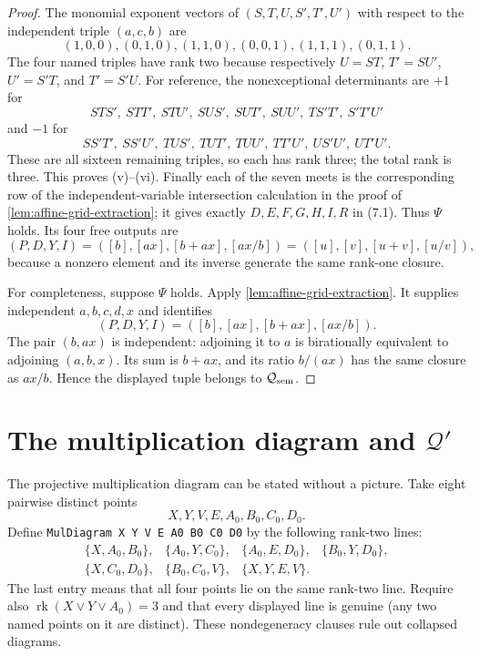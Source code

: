 \documentclass[11pt,oneside]{article}
\theoremstyle{definition}
\theoremstyle{remark}
\newcommand{\rk}{\operatorname{rk}}
\newcommand{\Qrel}{\mathcal{Q}}
\newcommand{\Qprel}{\mathcal{Q}'}
\newcommand{\lean}[1]{\nolinkurl{#1}}
\begin{document}
\begin{proof}
The monomial exponent vectors of $(S,T,U,S',T',U')$ with respect to the independent
triple $(a,c,b)$ are
\[
 (1,0,0),(0,1,0),(1,1,0),(0,0,1),(1,1,1),(0,1,1).
\]
The four named triples have rank two because respectively
$U=ST$, $T'=SU'$, $U'=S'T$, and $T'=S'U$.  For reference, the nonexceptional
determinants are $+1$ for
\[
 STS',\ STT',\ STU',\ SUS',\ SUT',\ SUU',\ TS'T',\ S'T'U'
\]
and $-1$ for
\[
 SS'T',\ SS'U',\ TUS',\ TUT',\ TUU',\ TT'U',\ US'U',\ UT'U'.
\]
These are all sixteen remaining triples, so each has rank three; the total rank is three.
This proves (v)--(vi).  Finally each of the seven meets is the corresponding row of the
independent-variable intersection calculation in the proof of
\cref{lem:affine-grid-extraction}; it gives exactly $D,E,F,G,H,I,R$ in (7.1).  Thus
$\Psi$ holds.  Its four free outputs are
\[
 (P,D,Y,I)=([b],[ax],[b+ax],[ax/b])
          =([u],[v],[u+v],[u/v]),
\]
because a nonzero element and its inverse generate the same rank-one closure.

For completeness, suppose $\Psi$ holds.  Apply
\cref{lem:affine-grid-extraction}.  It supplies independent $a,b,c,d,x$ and identifies
\[
 (P,D,Y,I)=([b],[ax],[b+ax],[ax/b]).
\]
The pair $(b,ax)$ is independent: adjoining it to $a$ is birationally equivalent to
adjoining $(a,b,x)$.  Its sum is $b+ax$, and its ratio $b/(ax)$ has the same closure as
$ax/b$.  Hence the displayed tuple belongs to $\Qrel_{\rm sem}$.

\end{proof}

\section[The multiplication diagram and Q-prime]
{The multiplication diagram and $\Qprel$}

The projective multiplication diagram can be stated without a picture.  Take eight
pairwise distinct points
\[
  X,Y,V,E,A_0,B_0,C_0,D_0.
\]
Define
\lean{MulDiagram X Y V E A0 B0 C0 D0} by the following rank-two lines:
\[
\begin{array}{llll}
\{X,A_0,B_0\}, & \{A_0,Y,C_0\}, & \{A_0,E,D_0\},&
\{B_0,Y,D_0\},\\
\{X,C_0,D_0\},& \{B_0,C_0,V\},&
\{X,Y,E,V\}.&
\end{array}
\]
The last entry means that all four points lie on the same rank-two line.  Require also
$\rk(X\vee Y\vee A_0)=3$ and that every displayed line is genuine (any two named points
on it are distinct).  These nondegeneracy clauses rule out collapsed diagrams.
\end{document}
